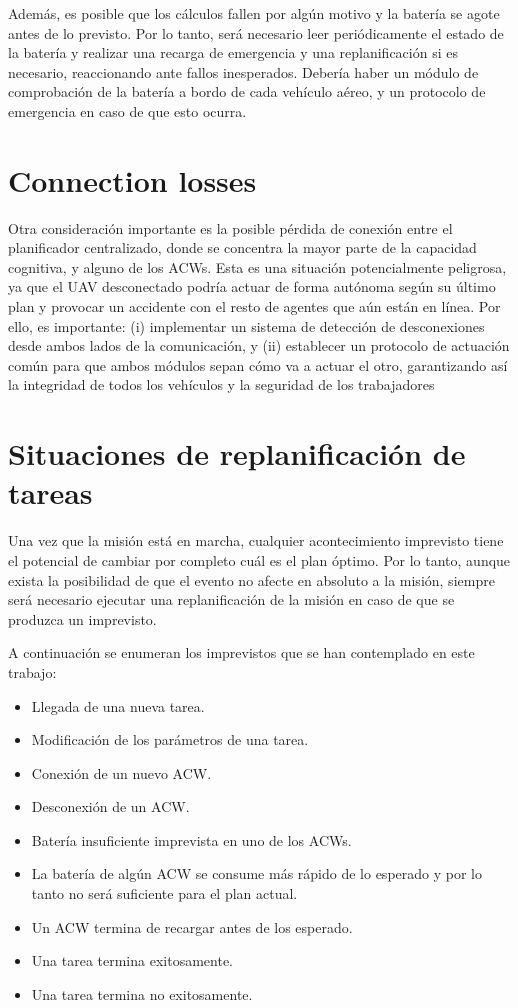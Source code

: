 \documentclass[fontsize=11pt, English=false, Español=true, Myfinal=true, twoside, numbers=noenddot]{scrbook}
\begin{document}
Además, es posible que los cálculos fallen por algún motivo y la batería se agote antes de lo previsto. Por lo tanto, será necesario leer periódicamente el estado de la batería y realizar una recarga de emergencia y una replanificación si es necesario, reaccionando ante fallos inesperados. Debería haber un módulo de comprobación de la batería a bordo de cada vehículo aéreo, y un protocolo de emergencia en caso de que esto ocurra.

\section{Connection losses}
\label{sec:ConnectionLosses}
Otra consideración importante es la posible pérdida de conexión entre el planificador centralizado, donde se concentra la mayor parte de la capacidad cognitiva, y alguno de los \glspl{ACW}. Esta es una situación potencialmente peligrosa, ya que el \gls{UAV} desconectado podría actuar de forma autónoma según su último plan y provocar un accidente con el resto de agentes que aún están en línea. Por ello, es importante: (i) implementar un sistema de detección de desconexiones desde ambos lados de la comunicación, y (ii) establecer un protocolo de actuación común para que ambos módulos sepan cómo va a actuar el otro, garantizando así la integridad de todos los vehículos y la seguridad de los trabajadores

\section{Situaciones de replanificación de tareas}
\label{sec:TaskReplanningSituations}
Una vez que la misión está en marcha, cualquier acontecimiento imprevisto tiene el potencial de cambiar por completo cuál es el plan óptimo. Por lo tanto, aunque exista la posibilidad de que el evento no afecte en absoluto a la misión, siempre será necesario ejecutar una replanificación de la misión en caso de que se produzca un imprevisto.

A continuación se enumeran los imprevistos que se han contemplado en este trabajo:

\begin{itemize}
    \item Llegada de una nueva tarea.
    \item Modificación de los parámetros de una tarea.
    \item Conexión de un nuevo \gls{ACW}.
    \item Desconexión de un \gls{ACW}.
    \item Batería insuficiente imprevista en uno de los \glspl{ACW}.
    \item La batería de algún \gls{ACW} se consume más rápido de lo esperado y por lo tanto no será suficiente para el plan actual.
    \item Un \gls{ACW} termina de recargar antes de los esperado.
    \item Una tarea termina exitosamente.
    \item Una tarea termina no exitosamente.
\end{itemize}
\end{document}
